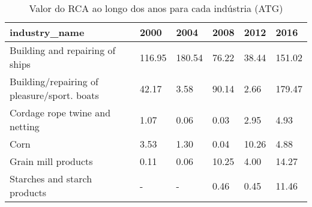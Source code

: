 \begin{table}
\centering
\caption{Valor do RCA ao longo dos anos para cada indústria (ATG)}
\begin{tabular}{p{6cm}p{1.5cm}p{1.5cm}p{1.5cm}p{1.5cm}p{1.5cm}}
\toprule
                              industry\_name &   2000 &   2004 &  2008 &  2012 &   2016 \\
\midrule
            Building and repairing of ships & 116.95 & 180.54 & 76.22 & 38.44 & 151.02 \\
Building/repairing of pleasure/sport. boats &  42.17 &   3.58 & 90.14 &  2.66 & 179.47 \\
             Cordage rope twine and netting &   1.07 &   0.06 &  0.03 &  2.95 &   4.93 \\
                                       Corn &   3.53 &   1.30 &  0.04 & 10.26 &   4.88 \\
                        Grain mill products &   0.11 &   0.06 & 10.25 &  4.00 &  14.27 \\
               Starches and starch products &      - &      - &  0.46 &  0.45 &  11.46 \\
\bottomrule
\end{tabular}
\end{table}
